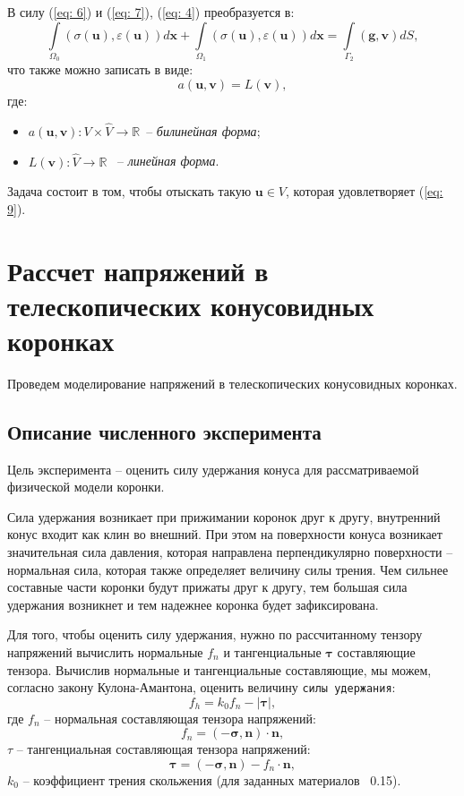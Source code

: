 \documentclass[a4paper, 14pt]{extreport}
\begin{document}
В силу (\ref{eq: 6}) и (\ref{eq: 7}), (\ref{eq: 4}) преобразуется в:
\begin{equation}
	\label{eq: 8}
	\int\limits_{\Omega_0}{(\sigma(\textbf{u}), \varepsilon(\textbf{u}))}d\textbf{x} + 
	\int\limits_{\Omega_1}{(\sigma(\textbf{u}), \varepsilon(\textbf{u}))}d\textbf{x} = 
		\int\limits_{\Gamma_2}{(\textbf{g}, \textbf{v})}dS,
\end{equation}
что также можно записать в виде:
\begin{equation}
	\label{eq: 9}
	a(\textbf{u}, \textbf{v}) = L(\textbf{v}),
\end{equation}
где:
\begin{itemize}
	\item $a(\textbf{u}, \textbf{v}) : V \times \hat{V} \rightarrow \mathbb{R}$ \,-- \textit{билинейная форма};
	\item $L(\textbf{v}) : \hat{V} \rightarrow \mathbb{R}$ \, -- \textit{линейная форма}.
\end{itemize}

Задача состоит в том, чтобы отыскать такую  $\textbf{u} \in V$, 
которая удовлетворяет (\ref{eq: 9}).


\chapter{Рассчет напряжений в телескопических конусовидных коронках}
\label{ch:exp}

Проведем моделирование напряжений в телескопических
конусовидных коронках.


\section{Описание численного эксперимента}

Цель эксперимента -- оценить силу удержания конуса для рассматриваемой физической модели коронки.

Сила удержания возникает при прижимании коронок друг
к другу, внутренний конус входит как клин во внешний.  
При этом на поверхности конуса возникает значительная сила 
давления, которая направлена перпендикулярно поверхности -- 
нормальная сила, которая также определяет величину силы 
трения. Чем сильнее составные части коронки будут прижаты 
друг к другу, тем большая сила удержания возникнет и тем 
надежнее коронка будет зафиксирована.

Для того, чтобы оценить силу удержания, нужно по 
рассчитанному тензору напряжений
вычислить нормальные $f_n$ и тангенциальные 
$\boldsymbol{\tau}$ составляющие тензора. 
Вычислив нормальные и тангенциальные составляющие, мы 
можем, согласно закону Кулона-Амантона, оценить величину 
\texttt{силы удержания}:
\begin{equation}
	\label{eq: ka}
	f_{h} = k_0 f_n -|\boldsymbol{\tau}|,
\end{equation}
где $f_n$ -- нормальная составляющая тензора напряжений:
$$f_n = (-\boldsymbol{\sigma}, \boldsymbol{n}) \cdot \boldsymbol{n},$$
$\tau$ -- тангенциальная составляющая тензора напряжений:
$$\boldsymbol{\tau} = (-\boldsymbol{\sigma}, \boldsymbol{n}) - f_n \cdot \boldsymbol{n},$$
$k_0$ -- коэффициент трения скольжения (для заданных материалов ~0.15).
\end{document}
